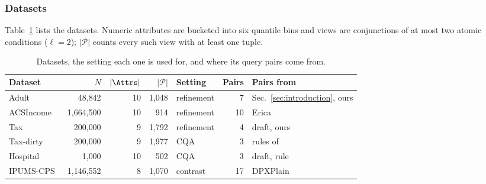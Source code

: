 \subsubsection{Datasets}
\label{subsubsec:datasets}

Table~\ref{tab:datasets} lists the datasets.
Numeric attributes are bucketed into six quantile bins and views are conjunctions of at most two atomic conditions ($\ell=2$); $|\mathcal{P}|$ counts every such view with at least one tuple.

\begin{table}[t]
\centering
\small
\caption{Datasets, the setting each one is used for, and where its query pairs come from.}
\label{tab:datasets}
\setlength{\tabcolsep}{3pt}
\begin{tabular}{@{}lrrrlrl@{}}
\toprule
Dataset & $N$ & $|\Attrs|$ & $|\mathcal{P}|$ & Setting & Pairs & Pairs from \\
\midrule
Adult~\cite{adult-uci}            & 48{,}842    & 10 & 1{,}048 & refinement & 7  & Sec.~\ref{sec:introduction}, ours \\
ACSIncome~\cite{DingHMS21}       & 1{,}664{,}500 & 10 & 914   & refinement & 10 & Erica~\cite{LMSJ23} \\
Tax~\cite{BohannonFGJK07}        & 200{,}000   & 9  & 1{,}792 & refinement & 4  & draft, ours \\
Tax-dirty~\cite{MahdaviAFMOST19} & 200{,}000   & 9  & 1{,}977 & CQA        & 3  & rules of~\cite{NiMZWLY24} \\
Hospital~\cite{rekatsinas2017}   & 1{,}000     & 10 & 502     & CQA        & 3  & draft, rule \\
IPUMS-CPS~\cite{TaoGMR22}        & 1{,}146{,}552 & 8 & 1{,}070 & contrast  & 17 & DPXPlain~\cite{TaoGMR22} \\
\bottomrule
\end{tabular}
\end{table}


